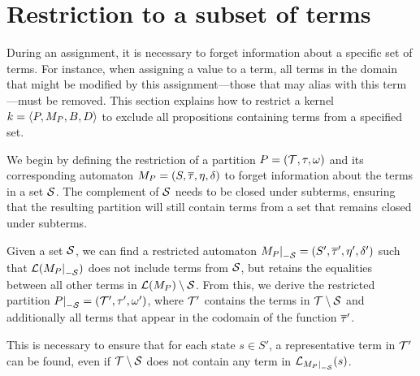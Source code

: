 \section{Restriction to a subset of terms}

During an assignment, it is necessary to forget information about a specific set of terms.
For instance, when assigning a value to a term, all terms in the domain that might be modified by this assignment---those that may alias with this term---must be removed.
This section explains how to restrict a kernel $k = \langle P, M_P, B, D\rangle$
to exclude all propositions containing terms from a specified set.

We begin by defining the restriction of a partition $P = (\mathcal{T}, \tau, \omega)$ and its corresponding automaton $M_P = (S, \overline{\tau}, \eta, \delta)$ to forget information about the terms in a set $\mathcal{S}$.
The complement of $\mathcal{S}$ needs to be closed under subterms, ensuring that the
resulting partition will still contain terms from a set that remains closed under subterms.

Given a set $\mathcal{S}$, we can find a restricted
automaton $\restr{M_P}{-\Set} = (S', \otau', \eta', \delta')$ such that $\L(\restr{M_P}{-\Set})$ does not include terms from
$\mathcal{S}$, but retains the equalities between all other terms in $\mathcal{L}(M_P) \setminus \mathcal{S}$.
From this, we derive the restricted partition $\restr{P}{-\Set} = (\T', \tau', \omega')$, where $\mathcal{T}'$ contains
the terms in $\mathcal{T} \setminus \mathcal{S}$ and additionally all terms that appear in the codomain of the function $\overline{\tau}'$.

This is necessary to ensure that for each state $s \in S'$, a representative term in $\mathcal{T}'$ can be found,
even if $\mathcal{T} \setminus \mathcal{S}$ does not contain any term in $\L_{\restr{M_P}{-\Set}}(s)$.

